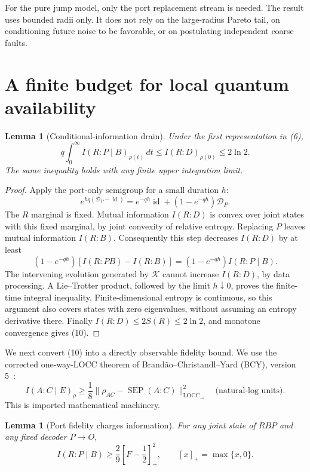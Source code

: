 \documentclass[11pt]{article}
\newtheorem{lemma}[theorem]{Lemma}
\newcommand{\id}{\operatorname{id}}
\newcommand{\SEP}{\operatorname{SEP}}
\newcommand{\locc}{\operatorname{LOCC}_{\to}}
\newcommand{\D}{\mathcal D}
\begin{document}
For the pure jump model, only the port replacement stream is needed.
The result uses bounded radii only. It does not rely on the large-radius
Pareto tail, on conditioning future noise to be favorable, or on
postulating independent coarse faults.

\section{A finite budget for local quantum availability}

\begin{lemma}[Conditional-information drain]\label{lem:drain}
Under the first representation in (6),
\[
 q\int_0^\infty I(R:P\mid B)_{\rho(t)}\,dt
       \leq I(R:D)_{\rho(0)}\leq2\ln2 .
 \tag{10}
\]
The same inequality holds with any finite upper integration limit.
\end{lemma}

\begin{proof}
Apply the port-only semigroup for a small duration \(h\):
\[
 e^{hq(\D_P-\id)}
       =e^{-qh}\id+(1-e^{-qh})\D_P .
\]
The \(R\) marginal is fixed. Mutual information \(I(R:D)\) is convex
over joint states with this fixed marginal, by joint convexity of
relative entropy. Replacing \(P\) leaves mutual information \(I(R:B)\).
Consequently this step decreases \(I(R:D)\) by at least
\[
 (1-e^{-qh})[I(R:PB)-I(R:B)]
      =(1-e^{-qh})I(R:P\mid B).
\]
The intervening evolution generated by \(\mathcal K\) cannot increase
\(I(R:D)\), by data processing. A Lie--Trotter product, followed by
the limit \(h\downarrow0\), proves the finite-time integral inequality.
Finite-dimensional entropy is continuous, so this argument also covers
states with zero eigenvalues, without assuming an entropy derivative
there. Finally \(I(R:D)\leq2S(R)\leq2\ln2\), and monotone convergence
gives (10).
\end{proof}

We next convert (10) into a directly observable fidelity bound. We use the
corrected one-way-LOCC theorem of
Brand\~ao--Christandl--Yard (BCY), version 5~\cite{BCY}:
\[
 I(A:C\mid E)_\rho
       \geq\frac18
       \bigl\|\rho_{AC}-\SEP(A:C)\bigr\|_{\locc}^2
 \quad\text{(natural-log units).}
 \tag{11}
\]
This is imported mathematical machinery.

\begin{lemma}[Port fidelity charges information]\label{lem:faith}
For any joint state of \(RBP\) and any fixed decoder \(P\to O\),
\[
 I(R:P\mid B)\geq
       \frac29\left[F-\frac12\right]_+^2,
 \qquad [x]_+=\max\{x,0\}.
 \tag{12}
\]
\end{lemma}
\end{document}
